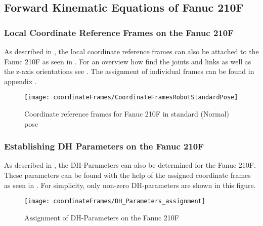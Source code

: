 \subsection{Forward Kinematic Equations of Fanuc 210F}



\subsubsection{Local Coordinate Reference Frames on the Fanuc 210F}

As described in , the local coordinate reference frames can also be attached to the Fanuc 210F as seen in . For an overview how find the joints and links as well as the z-axis orientations see . %
The assignment of individual frames can be found in appendix .\\

\begin{figure}[H]
	\texttt{[image: coordinateFrames/CoordinateFramesRobotStandardPose]}
	\caption{Coordinate reference frames for Fanuc 210F in standard (Normal) pose}
	\label{fig:RefFrame}
\end{figure}






\medskip




\subsubsection{Establishing \ac{DH} Parameters on the Fanuc 210F}

As described in , the \ac{DH}-Parameters can also be determined for the Fanuc 210F.
These parameters can be found with the help of the assigned coordinate frames as seen in . For simplicity, only non-zero DH-parameters are shown in this figure.

\begin{figure}[h]
	\texttt{[image: coordinateFrames/DH\_Parameters\_assignment]}
	\caption{Assignment of DH-Parameters on the Fanuc 210F}
	\label{fig:DH_Parameters_Fanuc210F}
\end{figure}


